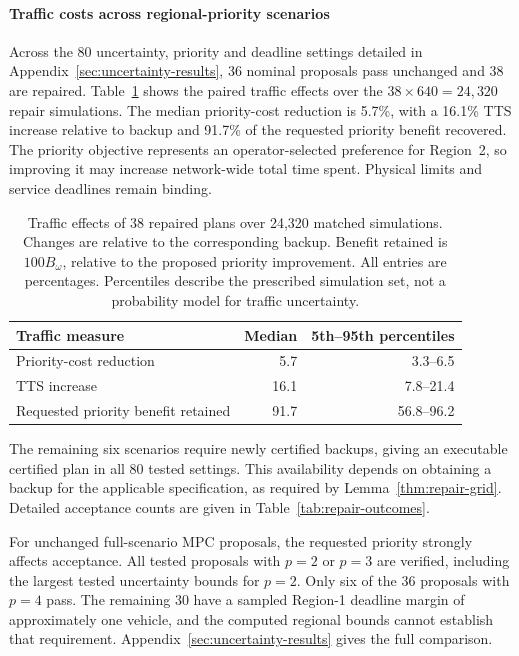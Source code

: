 \documentclass[final]{cas-sc}
\theoremstyle{definition}
\theoremstyle{plain}
\theoremstyle{definition}
\theoremstyle{plain}
\newcommand{\appref}[1]{Appendix~\ref{#1}}
\begin{document}
\paragraph{Traffic costs across regional-priority scenarios}
Across the 80 uncertainty, priority and deadline settings detailed in
\appref{sec:uncertainty-results}, 36 nominal proposals pass unchanged
and 38 are repaired. Table~\ref{tab:repair-traffic-tradeoffs} shows the
paired traffic effects over the $38\times640=24{,}320$ repair simulations.
The median priority-cost reduction is 5.7\%, with a 16.1\% TTS increase
relative to backup and 91.7\% of the requested priority benefit
recovered. The priority objective represents an operator-selected
preference for Region~2, so improving it may increase network-wide
total time spent. Physical limits and service deadlines remain binding.
\begin{table}[pos=!htb]
\centering\small
\caption{Traffic effects of 38 repaired plans over 24,320 matched
simulations. Changes are relative to the corresponding backup. Benefit
retained is $100B_\omega$, relative to the proposed priority improvement.
All entries are percentages. Percentiles describe the prescribed
simulation set, not a probability model for traffic uncertainty.}
\label{tab:repair-traffic-tradeoffs}
\begin{tabularx}{\linewidth}{@{}Xrr@{}}
\toprule
Traffic measure & Median & 5th--95th percentiles\\
\midrule
Priority-cost reduction & 5.7 & 3.3--6.5\\
TTS increase & 16.1 & 7.8--21.4\\
Requested priority benefit retained & 91.7 & 56.8--96.2\\
\bottomrule
\end{tabularx}
\end{table}

The remaining six scenarios require newly certified backups, giving
an executable certified plan in all 80 tested settings. This availability
depends on obtaining a backup for the applicable specification, as
required by Lemma~\ref{thm:repair-grid}. Detailed acceptance counts are
given in Table~\ref{tab:repair-outcomes}.

For unchanged full-scenario MPC proposals, the requested priority
strongly affects acceptance. All tested proposals with $p=2$ or $p=3$
are verified, including the largest tested uncertainty bounds for
$p=2$. Only six of the 36 proposals with $p=4$ pass. The remaining
30 have a sampled Region-1 deadline margin of approximately one
vehicle, and the computed regional bounds cannot establish that
requirement. \appref{sec:uncertainty-results} gives the full comparison.
\end{document}
